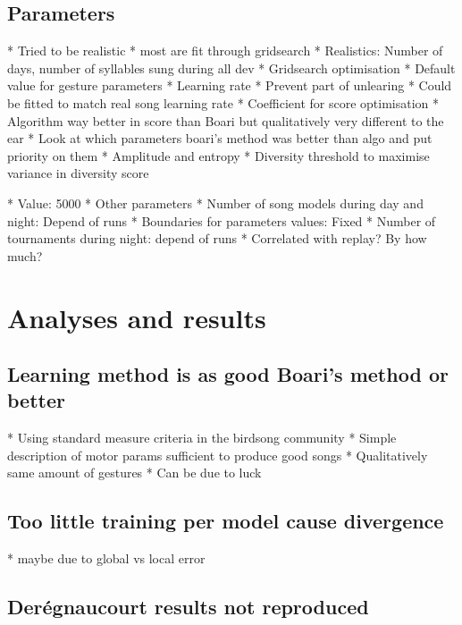 \documentclass{report}
\begin{document}
\section{Parameters}\label{parameters}

  * Tried to be realistic
  * most are fit through gridsearch
  * Realistics: Number of days, number of syllables sung during all dev
  * Gridsearch optimisation
  * Default value for gesture parameters
  * Learning rate
        * Prevent part of unlearing
      * Could be fitted to match real song learning rate
      * Coefficient for score optimisation
    * Algorithm way better in score than Boari but qualitatively very
  different to the ear
  * Look at which parameters boari's method was better than algo and put
  priority on them
  * Amplitude and entropy
  * Diversity threshold to maximise variance in diversity score

        * Value: 5000
      * Other parameters
    * Number of song models during day and night: Depend of runs
  * Boundaries for parameters values: Fixed
  * Number of tournaments during night: depend of runs
        * Correlated with replay? By how much?

\chapter{Analyses and results}\label{analyses-and-results}

\section{Learning method is as good Boari's method or
better}\label{learning-method-is-as-good-boaris-method-or-better}

  * Using standard measure criteria in the birdsong community
  * Simple description of motor params sufficient to produce good songs
  * Qualitatively same amount of gestures
        * Can be due to luck

  \section{Too little training per model cause
divergence}\label{too-little-training-per-model-cause-divergence}

  * maybe due to global vs local error
\section{Derégnaucourt results not
reproduced}\label{deruxe9gnaucourt-results-not-reproduced}
\end{document}

